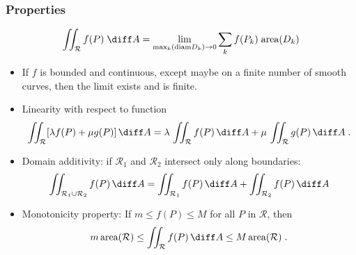 \begin{frame}
\frametitle{Properties}
\[
\iint_{\mathcal{R}} f(P) \; \diff A = \lim_{\max_k(\text{diam}D_k) \to 0} \sum_k f(P_k) \; \text{area}(D_k)
\]
\begin{itemize}
\item<2-> If $f$ is bounded and continuous, except maybe on a finite number of smooth curves, then the limit exists and is finite.
\item  Linearity with respect to function
\[
\iint_{\mathcal{R}} [\lambda f(P) +\mu g(P)] \, \diff A = \lambda \, \iint_{\mathcal{R}} f(P) \, \diff A +\mu \, \iint_{\mathcal{R}} g(P) \, \diff A \; .
\]
\item Domain additivity: if $\mathcal{R}_1$ and $\mathcal{R}_2$ intersect only along boundaries:
\[
\iint_{\mathcal{R}_1\cup \mathcal{R}_2} f(P)\, \diff A = \iint_{\mathcal{R}_1} f(P)\, \diff A + \iint_{\mathcal{R}_2} f(P)\, \diff A 
\]
\item \pause Monotonicity property: If $m \leq f(P) \leq M$ for all $P$ in $\mathcal{R}$, then
\[
m \, \text{area}(\mathcal{R}) \leq \iint_{\mathcal{R}} f(P)\, \diff A \leq M \, \text{area} (\mathcal{R})\; .
\]
\end{itemize}
\end{frame}